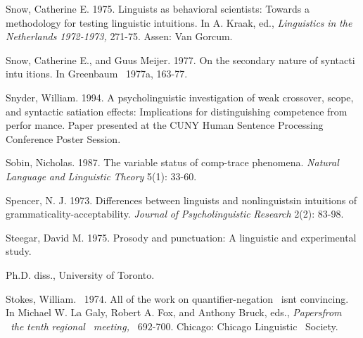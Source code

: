 \begin{styleStandard}
Snow, Catherine E. 1975. Linguists as behavioral scientists: Towards a methodology for testing linguistic intuitions. In A. Kraak, ed., \textit{Linguistics}\textit{ }\textit{in}\textit{ }\textit{the}\textit{ }\textit{Netherlands}\textit{ }\textit{1972-1973,}\textit{ }271-75. Assen: Van Gorcum.
\end{styleStandard}


\begin{styleStandard}
Snow, Catherine E., and Guus Meijer. 1977. On the secondary nature of syntacti intu\- itions. In Greenbaum \ 1977a, 163-77.
\end{styleStandard}


\begin{styleStandard}
Snyder, William. 1994. A psycholinguistic investigation of weak crossover, scope, and syntactic satiation effects: Implications for distinguishing competence from perfor\- mance. Paper presented at the CUNY Human Sentence Processing Conference Poster Session.
\end{styleStandard}


\begin{styleStandard}
Sobin, Nicholas. 1987. The variable status of comp-trace phenomena. \textit{Natural}\textit{ }\textit{Language}\textit{ }\textit{and}\textit{ }\textit{Linguistic}\textit{ }\textit{Theory}\textit{ }5(1): 33-60.
\end{styleStandard}


\begin{styleStandard}
Spencer, N. J. 1973. Differences between linguists and nonlinguists{\textquotesingle}in intuitions of grammaticality-acceptability. \textit{Journal}\textit{ }\textit{of}\textit{ }\textit{Psycholinguistic}\textit{ }\textit{Research}\textit{ }2(2): 83-98.
\end{styleStandard}


\begin{styleStandard}
Steegar, David M. 1975. Prosody and punctuation: A linguistic and experimental study.
\end{styleStandard}


\begin{styleStandard}
Ph.D. diss., University of Toronto.
\end{styleStandard}


\begin{styleStandard}
Stokes, William. \ 1974. All of the work on quantifier-negation \ isn{\textquotesingle}t convincing. In Michael W. La Galy, Robert A. Fox, and Anthony Bruck, eds., \textit{Papers}\textit{from}\textit{ }\textit{\ }\textit{the}\textit{ }\textit{tenth}\textit{ }\textit{regional }\textit{\ }\textit{meeting, }\textit{\ }692-700. Chicago: Chicago Linguistic \ Society.
\end{styleStandard}


